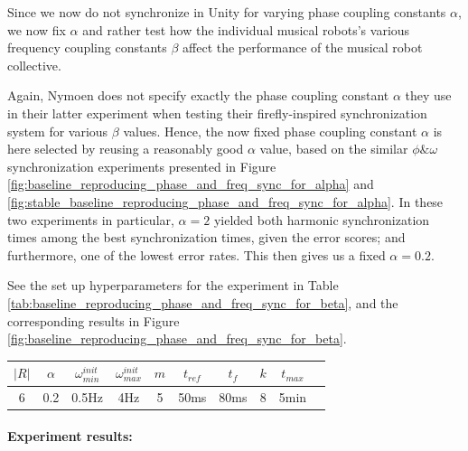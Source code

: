 		Since we now do not synchronize in Unity for varying phase coupling constants $\alpha$, we now fix $\alpha$ and rather test how the individual musical robots's various frequency coupling constants $\beta$ affect the performance of the musical robot collective.
		
		Again, Nymoen does not specify exactly the phase coupling constant $\alpha$ they use in their latter experiment when testing their firefly-inspired synchronization system for various $\beta$ values. Hence, the now fixed phase coupling constant $\alpha$ is here selected by reusing a reasonably good $\alpha$ value, based on the similar $\phi\&\omega$ synchronization experiments presented in Figure \ref{fig:baseline_reproducing_phase_and_freq_sync_for_alpha} and \ref{fig:stable_baseline_reproducing_phase_and_freq_sync_for_alpha}. In these two experiments in particular, $\alpha=2$ yielded both harmonic synchronization times among the best synchronization times, given the error scores; and furthermore, one of the lowest error rates. This then gives us a fixed $\alpha = 0.2$.
		
		See the set up hyperparameters for the experiment in Table \ref{tab:baseline_reproducing_phase_and_freq_sync_for_beta}, and the corresponding results in Figure \ref{fig:baseline_reproducing_phase_and_freq_sync_for_beta}.
		
		\begin{center}
		\begin{tabular}{ |c|c|c|c|c|c|c|c|c|c| } 
		\hline
		$|R|$ & $\alpha$ & $\omega_{min}^{init}$ & $\omega_{max}^{init}$ & $m$ & $t_{ref}$ & $t_f$ & $k$ & $t_{max}$ \\
		\hline
		6 & 0.2 & 0.5Hz & 4Hz & 5 & 50ms & 80ms & 8 & 5min \\
		\hline
		\end{tabular}
		\label{tab:baseline_reproducing_phase_and_freq_sync_for_beta}
		\end{center}
		
		\paragraph{Experiment results:\nl}
		
